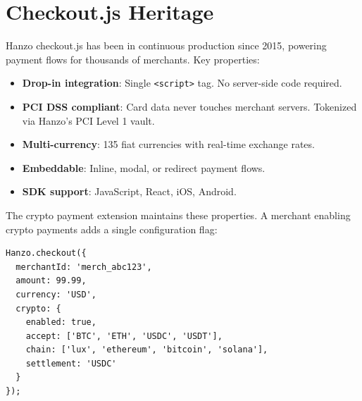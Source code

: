 \section{Checkout.js Heritage}

\label{sec:checkout}

Hanzo checkout.js has been in continuous production since 2015, powering
payment flows for thousands of merchants. Key properties:

\begin{itemize}[leftmargin=1.4em]
    \item \textbf{Drop-in integration}: Single \texttt{<script>} tag.
    No server-side code required.
    \item \textbf{PCI DSS compliant}: Card data never touches merchant
    servers. Tokenized via Hanzo's PCI Level 1 vault.
    \item \textbf{Multi-currency}: 135 fiat currencies with real-time
    exchange rates.
    \item \textbf{Embeddable}: Inline, modal, or redirect payment flows.
    \item \textbf{SDK support}: JavaScript, React, iOS, Android.
\end{itemize}

The crypto payment extension maintains these properties. A merchant
enabling crypto payments adds a single configuration flag:

\begin{verbatim}
Hanzo.checkout({
  merchantId: 'merch_abc123',
  amount: 99.99,
  currency: 'USD',
  crypto: {
    enabled: true,
    accept: ['BTC', 'ETH', 'USDC', 'USDT'],
    chain: ['lux', 'ethereum', 'bitcoin', 'solana'],
    settlement: 'USDC'
  }
});
\end{verbatim}

